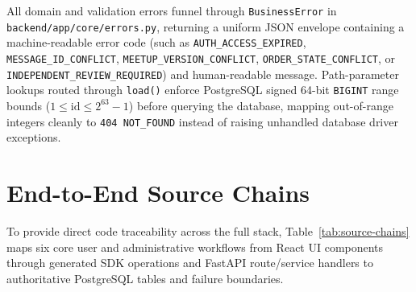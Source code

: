 All domain and validation errors funnel through \texttt{BusinessError} in \texttt{backend/app/\allowbreak core/\allowbreak errors.py}, returning a uniform JSON envelope containing a machine-readable error code (such as \texttt{AUTH\_\allowbreak ACCESS\_\allowbreak EXPIRED}, \texttt{MESSAGE\_\allowbreak ID\_\allowbreak CONFLICT}, \texttt{MEETUP\_\allowbreak VERSION\_\allowbreak CONFLICT}, \texttt{ORDER\_\allowbreak STATE\_\allowbreak CONFLICT}, or \texttt{INDEPENDENT\_\allowbreak REVIEW\_\allowbreak REQUIRED}) and human-readable message. Path-parameter lookups routed through \texttt{load()} enforce PostgreSQL signed 64-bit \texttt{BIGINT} range bounds ($1 \le \text{id} \le 2^{63}-1$) before querying the database, mapping out-of-range integers cleanly to \texttt{404 NOT\_FOUND} instead of raising unhandled database driver exceptions.

\section{End-to-End Source Chains}
\label{sec:impl-chains}

To provide direct code traceability across the full stack, Table~\ref{tab:source-chains} maps six core user and administrative workflows from React UI components through generated SDK operations and FastAPI route/service handlers to authoritative PostgreSQL tables and failure boundaries.

